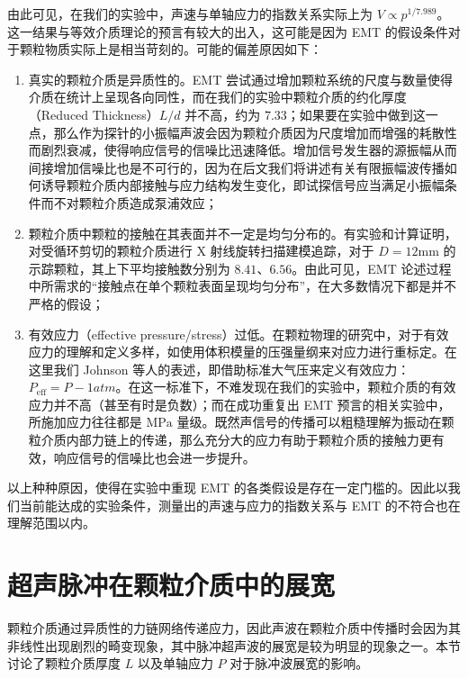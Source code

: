 由此可见，在我们的实验中，声速与单轴应力的指数关系实际上为 $V\propto p^{1/7.989}$。这一结果与等效介质理论的预言有较大的出入，这可能是因为 EMT 的假设条件对于颗粒物质实际上是相当苛刻的。可能的偏差原因如下：

\begin{enumerate}
  \item 真实的颗粒介质是异质性的。EMT 尝试通过增加颗粒系统的尺度与数量使得介质在统计上呈现各向同性，而在我们的实验中颗粒介质的约化厚度（Reduced Thickness）$L/d$ 并不高，约为 $7.33$；如果要在实验中做到这一点，那么作为探针的小振幅声波会因为颗粒介质因为尺度增加而增强的耗散性而剧烈衰减，使得响应信号的信噪比迅速降低。增加信号发生器的源振幅从而间接增加信噪比也是不可行的，因为在后文我们将讲述有关有限振幅波传播如何诱导颗粒介质内部接触与应力结构发生变化，即试探信号应当满足小振幅条件而不对颗粒介质造成泵浦效应；
  \item 颗粒介质中颗粒的接触在其表面并不一定是均匀分布的。有实验和计算证明，对受循环剪切的颗粒介质进行 X 射线旋转扫描建模追踪，对于 $D=12\unit{\milli\meter}$ 的示踪颗粒，其上下平均接触数分别为 $8.41$、$6.56$\cite{doi:10.1126/sciadv.abe8737}。由此可见，EMT 论述过程中所需求的“接触点在单个颗粒表面呈现均匀分布”，在大多数情况下都是并不严格的假设；
  \item 有效应力（effective pressure/stress）过低。在颗粒物理的研究中，对于有效应力的理解和定义多样，如使用体积模量的压强量纲来对应力进行重标定\cite{chengReviewAnalysisGranular2019}。在这里我们 Johnson 等人的表述，即借助标准大气压来定义有效应力： $P_{\text{eff}} = P - 1\unit{atm}$\cite{Johnson_2005}。在这一标准下，不难发现在我们的实验中，颗粒介质的有效应力并不高（甚至有时是负数）；而在成功重复出 EMT 预言的相关实验中，所施加应力往往都是 $\unit{\mega\pascal}$ 量级。既然声信号的传播可以粗糙理解为振动在颗粒介质内部力链上的传递，那么充分大的应力有助于颗粒介质的接触力更有效，响应信号的信噪比也会进一步提升。
\end{enumerate}

以上种种原因，使得在实验中重现 EMT 的各类假设是存在一定门槛的。因此以我们当前能达成的实验条件，测量出的声速与应力的指数关系与 EMT 的不符合也在理解范围以内。


\section{超声脉冲在颗粒介质中的展宽}


颗粒介质通过异质性的力链网络传递应力，因此声波在颗粒介质中传播时会因为其非线性出现剧烈的畸变现象，其中脉冲超声波的展宽是较为明显的现象之一。本节讨论了颗粒介质厚度 $L$ 以及单轴应力 $P$ 对于脉冲波展宽的影响。

